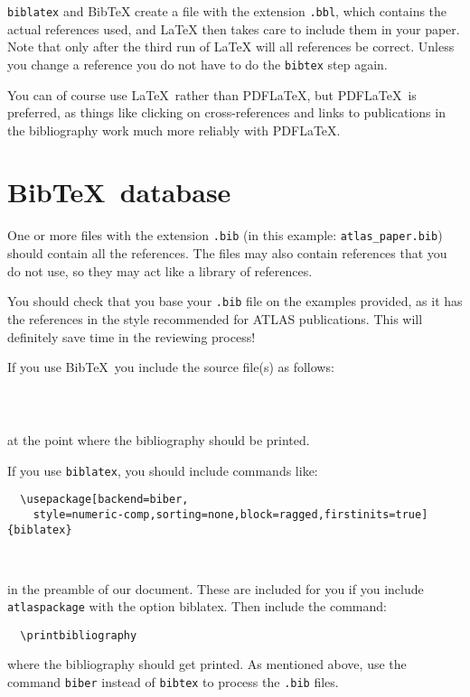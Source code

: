 \documentclass[UKenglish]{latex/atlasdoc}
\newcommand*{\BibTeX}{Bib\TeX}
\newcommand{\File}[1]{\texttt{#1}\xspace}
\newcommand{\Option}[1]{\textsf{#1}\xspace}
\newcommand{\Package}[1]{\texttt{#1}\xspace}
\begin{document}
\Package{biblatex} and \BibTeX{} create a file with the extension \texttt{.bbl}, which
contains the actual references used, and \LaTeX{} then takes care
to include them in your paper. Note that only after the third run of
\LaTeX{} will all references be correct. Unless you change a reference
you do not have to do the \texttt{bibtex} step again.

You can of course use \LaTeX\ rather than PDF\LaTeX, but PDF\LaTeX\ is preferred,
as things like clicking on cross-references and links to publications in the bibliography
work much more reliably with PDF\LaTeX.


\section{\BibTeX\ database}

One or more files with the extension \texttt{.bib} 
(in this example: \texttt{atlas\_paper.bib}) should contain all the references. 
The files may also contain references that you do not use, so they may act like a
library of references. 

You should check that you base your \File{.bib} file on the examples provided,
as it has the references in the style recommended for ATLAS publications.
This will definitely save time in the reviewing process!

If you use \BibTeX\ you include the source file(s) as follows:
%
\begin{verbatim}
  
  
\end{verbatim}
at the point where the bibliography should be printed.

If you use \Package{biblatex}, you should include commands like:
%
\begin{verbatim}
  \usepackage[backend=biber,
    style=numeric-comp,sorting=none,block=ragged,firstinits=true]{biblatex}
  
  
\end{verbatim}
%
in the preamble of our document.
These are included for you if you include \Package{atlaspackage} with the option \Option{biblatex}.
Then include the command:
%
\begin{verbatim}
  \printbibliography
\end{verbatim}
%
where the bibliography should get printed.
As mentioned above, use the command \texttt{biber} instead of \texttt{bibtex} to process the \texttt{.bib} files.
\end{document}
